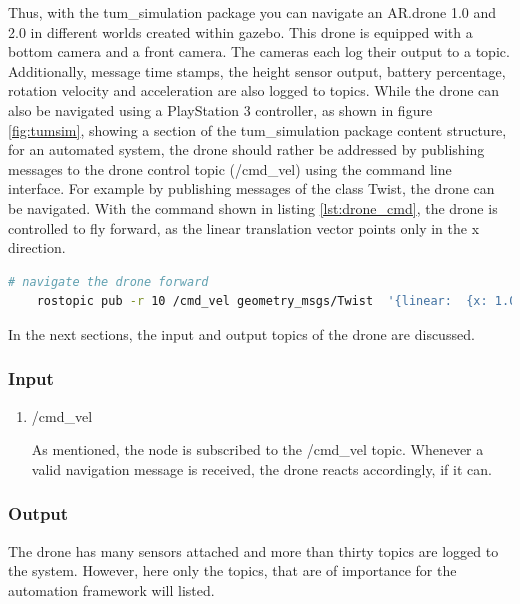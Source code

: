 	
	Thus, with the tum\_simulation package you can navigate an AR.drone 1.0 and 2.0 in different worlds created within gazebo. This drone is equipped with a bottom camera 
	and a front camera. The cameras each log their output to a topic. Additionally, message time stamps, the height sensor output, 
	battery percentage, rotation
	velocity and acceleration are also logged to topics. While the drone can also be navigated using a PlayStation 3 controller, as shown in figure 
	\ref{fig:tumsim}, showing a section of the tum\_simulation package content structure, 
	for an automated system, the drone should rather be addressed by publishing messages to the drone control topic (/cmd\_vel)
	using the command line interface. For example 
	by publishing messages of the class Twist, the drone can be navigated. With the command shown in listing \ref{lst:drone_cmd}, the drone is 
	controlled to fly forward, as the linear translation vector points only in the x direction.  
	
	\begin{lstlisting}[language=bash, caption= Drone navigation command, label=lst:drone_cmd]
	# navigate the drone forward
    rostopic pub -r 10 /cmd_vel geometry_msgs/Twist  '{linear:  {x: 1.0, y: 0.0, z: 0.0}, angular: {x: 0.0,y: 0.0,z: 0.0}}'
	\end{lstlisting}
	
	In the next sections, the input and output topics of the drone are discussed. 
	
	\subsubsection{Input}
	
	\begin{enumerate}
	\item{/cmd\_vel}
	
	As mentioned, the node is subscribed to the /cmd\_vel topic. Whenever a valid navigation message is received, the drone reacts accordingly, 
	if it can. 
	
	\end{enumerate}
	
	\subsubsection{Output}\label{simout}
	
	The drone has many sensors attached and more than thirty topics are logged to the system. However, here only the topics, that are of importance 
	for the automation framework will listed. 
	
